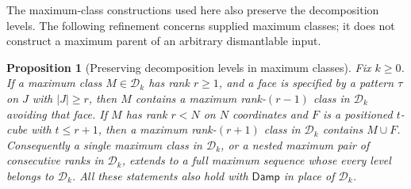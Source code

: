 \documentclass[11pt]{article}
\newtheorem{proposition}{Proposition}[section]
\theoremstyle{definition}
\newcommand{\Damp}{\mathsf{Damp}}
\begin{document}
The maximum-class constructions used here also preserve the decomposition
levels. The following refinement concerns supplied maximum classes; it
does not construct a maximum parent of an arbitrary dismantlable input.

\begin{proposition}[Preserving decomposition levels in maximum classes]
\label{prop:decomposable-maximum-sequences}
Fix $k\ge0$. If a maximum class $M\in\mathcal D_k$ has rank $r\ge1$,
and a face is specified by a pattern $\tau$ on $J$ with $|J|\ge r$,
then $M$ contains a maximum rank-$(r-1)$ class in $\mathcal D_k$ avoiding
that face. If $M$ has rank $r<N$ on $N$ coordinates and $F$ is a
positioned $t$-cube with $t\le r+1$, then a maximum rank-$(r+1)$
class in $\mathcal D_k$ contains $M\cup F$.
Consequently a single maximum class in $\mathcal D_k$, or a nested
maximum pair of consecutive ranks in $\mathcal D_k$, extends to a full
maximum sequence whose every level belongs to $\mathcal D_k$.
All these statements also hold with $\Damp$ in place of $\mathcal D_k$.
\end{proposition}
\end{document}
